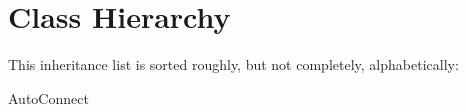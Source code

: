 \section{Class Hierarchy}
This inheritance list is sorted roughly, but not completely, alphabetically\+:\begin{DoxyCompactList}
\item Auto\+Connect\begin{DoxyCompactList}
\item {}
\end{DoxyCompactList}
\end{DoxyCompactList}

